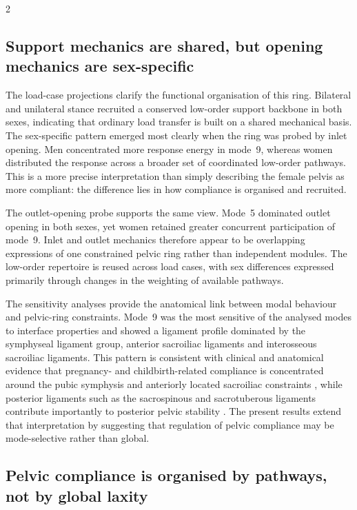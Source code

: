 \documentclass[openacc]{rsproca_new}
\begin{document}
\begin{multicols}{2}
\subsection{Support mechanics are shared, but opening mechanics are sex-specific}

The load-case projections clarify the functional organisation of this ring. Bilateral and unilateral stance recruited a conserved low-order support backbone in both sexes, indicating that ordinary load transfer is built on a shared mechanical basis. The sex-specific pattern emerged most clearly when the ring was probed by inlet opening. Men concentrated more response energy in mode~9, whereas women distributed the response across a broader set of coordinated low-order pathways. This is a more precise interpretation than simply describing the female pelvis as more compliant: the difference lies in how compliance is organised and recruited.

The outlet-opening probe supports the same view. Mode~5 dominated outlet opening in both sexes, yet women retained greater concurrent participation of mode~9. Inlet and outlet mechanics therefore appear to be overlapping expressions of one constrained pelvic ring rather than independent modules. The low-order repertoire is reused across load cases, with sex differences expressed primarily through changes in the weighting of available pathways.

The sensitivity analyses provide the anatomical link between modal behaviour and pelvic-ring constraints. Mode~9 was the most sensitive of the analysed modes to interface properties and showed a ligament profile dominated by the symphyseal ligament group, anterior sacroiliac ligaments and interosseous sacroiliac ligaments. This pattern is consistent with clinical and anatomical evidence that pregnancy- and childbirth-related compliance is concentrated around the pubic symphysis and anteriorly located sacroiliac constraints \cite{Damen2001, Pires2015, Cicek2015, Fiani2021}, while posterior ligaments such as the sacrospinous and sacrotuberous ligaments contribute importantly to posterior pelvic stability \cite{Hammer2019}. The present results extend that interpretation by suggesting that regulation of pelvic compliance may be mode-selective rather than global.

\subsection{Pelvic compliance is organised by pathways, not by global laxity}


\end{multicols}
\end{document}
